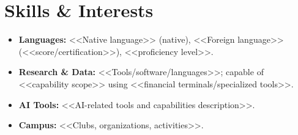 \documentclass[a4paper, 10pt]{article}
\begin{document}
\section{Skills \& Interests}

\begin{itemize}
  \item \textbf{Languages:} <<Native language>> (native), <<Foreign language>> (<<score/certification>>), <<proficiency level>>.
  \item \textbf{Research \& Data:} <<Tools/software/languages>>; capable of <<capability scope>> using <<financial terminals/specialized tools>>.
  \item \textbf{AI Tools:} <<AI-related tools and capabilities description>>.
  \item \textbf{Campus:} <<Clubs, organizations, activities>>.
\end{itemize}
\end{document}
